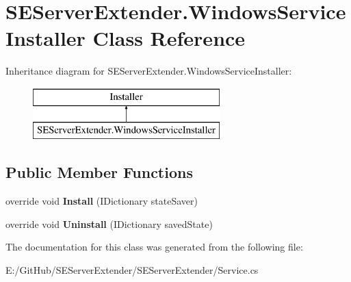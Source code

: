 \hypertarget{class_s_e_server_extender_1_1_windows_service_installer}{}\section{S\+E\+Server\+Extender.\+Windows\+Service\+Installer Class Reference}
\label{class_s_e_server_extender_1_1_windows_service_installer}
Inheritance diagram for S\+E\+Server\+Extender.\+Windows\+Service\+Installer\+:\begin{figure}[H]
\begin{center}
\leavevmode
\includegraphics[height=2.000000cm]{class_s_e_server_extender_1_1_windows_service_installer}
\end{center}
\end{figure}
\subsection*{Public Member Functions}
\begin{DoxyCompactItemize}
\item 
\hypertarget{class_s_e_server_extender_1_1_windows_service_installer_a4791f52b5ebf006d80164a1aeedfde18}{}override void {\bfseries Install} (I\+Dictionary state\+Saver)\label{class_s_e_server_extender_1_1_windows_service_installer_a4791f52b5ebf006d80164a1aeedfde18}

\item 
\hypertarget{class_s_e_server_extender_1_1_windows_service_installer_a0c39715e840c8b8d131233daa4140075}{}override void {\bfseries Uninstall} (I\+Dictionary saved\+State)\label{class_s_e_server_extender_1_1_windows_service_installer_a0c39715e840c8b8d131233daa4140075}

\end{DoxyCompactItemize}


The documentation for this class was generated from the following file\+:\begin{DoxyCompactItemize}
\item 
E\+:/\+Git\+Hub/\+S\+E\+Server\+Extender/\+S\+E\+Server\+Extender/Service.\+cs\end{DoxyCompactItemize}
